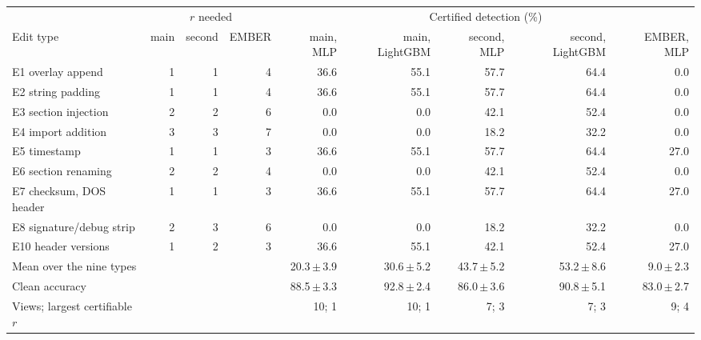 \begin{tabular}{lrrrrrrrr}
\toprule
 & \multicolumn{3}{c}{$r$ needed} & \multicolumn{5}{c}{Certified detection (\%)} \\
\cmidrule(lr){2-4}\cmidrule(lr){5-9}
Edit type & main & second & EMBER & main, MLP & main, LightGBM & second, MLP & second, LightGBM & EMBER, MLP \\
\midrule
E1 overlay append & 1 & 1 & 4 & 36.6 & 55.1 & 57.7 & 64.4 & 0.0 \\
E2 string padding & 1 & 1 & 4 & 36.6 & 55.1 & 57.7 & 64.4 & 0.0 \\
E3 section injection & 2 & 2 & 6 & 0.0 & 0.0 & 42.1 & 52.4 & 0.0 \\
E4 import addition & 3 & 3 & 7 & 0.0 & 0.0 & 18.2 & 32.2 & 0.0 \\
E5 timestamp & 1 & 1 & 3 & 36.6 & 55.1 & 57.7 & 64.4 & 27.0 \\
E6 section renaming & 2 & 2 & 4 & 0.0 & 0.0 & 42.1 & 52.4 & 0.0 \\
E7 checksum, DOS header & 1 & 1 & 3 & 36.6 & 55.1 & 57.7 & 64.4 & 27.0 \\
E8 signature/debug strip & 2 & 3 & 6 & 0.0 & 0.0 & 18.2 & 32.2 & 0.0 \\
E10 header versions & 1 & 2 & 3 & 36.6 & 55.1 & 42.1 & 52.4 & 27.0 \\
\midrule
Mean over the nine types &  &  &  & 20.3\,$\pm$\,3.9 & 30.6\,$\pm$\,5.2 & 43.7\,$\pm$\,5.2 & 53.2\,$\pm$\,8.6 & 9.0\,$\pm$\,2.3 \\
Clean accuracy &  &  &  & 88.5\,$\pm$\,3.3 & 92.8\,$\pm$\,2.4 & 86.0\,$\pm$\,3.6 & 90.8\,$\pm$\,5.1 & 83.0\,$\pm$\,2.7 \\
Views; largest certifiable $r$ &  &  &  & 10; 1 & 10; 1 & 7; 3 & 7; 3 & 9; 4 \\
\bottomrule
\end{tabular}
